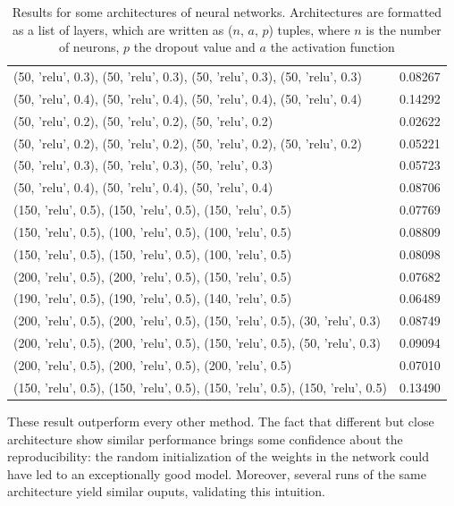 \begin{table}[h!]
\begin{tabular}{|p{}|p{}|}
        (50, 'relu', 0.3), (50, 'relu', 0.3), (50, 'relu', 0.3), (50, 'relu', 0.3) & 0.08267 \\
        (50, 'relu', 0.4), (50, 'relu', 0.4), (50, 'relu', 0.4), (50, 'relu', 0.4) & 0.14292 \\
        (50, 'relu', 0.2), (50, 'relu', 0.2), (50, 'relu', 0.2) & 0.02622 \\
        (50, 'relu', 0.2), (50, 'relu', 0.2), (50, 'relu', 0.2), (50, 'relu', 0.2) & 0.05221 \\
        (50, 'relu', 0.3), (50, 'relu', 0.3), (50, 'relu', 0.3) & 0.05723 \\
        (50, 'relu', 0.4), (50, 'relu', 0.4), (50, 'relu', 0.4) & 0.08706 \\
        (150, 'relu', 0.5), (150, 'relu', 0.5), (150, 'relu', 0.5) & 0.07769 \\
        (150, 'relu', 0.5), (100, 'relu', 0.5), (100, 'relu', 0.5) & 0.08809 \\
        (150, 'relu', 0.5), (150, 'relu', 0.5), (100, 'relu', 0.5) & 0.08098 \\
        (200, 'relu', 0.5), (200, 'relu', 0.5), (150, 'relu', 0.5) & 0.07682 \\
        (190, 'relu', 0.5), (190, 'relu', 0.5), (140, 'relu', 0.5) & 0.06489 \\
        (200, 'relu', 0.5), (200, 'relu', 0.5), (150, 'relu', 0.5), (30, 'relu', 0.3) & 0.08749 \\
        (200, 'relu', 0.5), (200, 'relu', 0.5), (150, 'relu', 0.5), (50, 'relu', 0.3) & 0.09094 \\
        (200, 'relu', 0.5), (200, 'relu', 0.5), (200, 'relu', 0.5) & 0.07010 \\
        (150, 'relu', 0.5), (150, 'relu', 0.5), (150, 'relu', 0.5), (150, 'relu', 0.5) & 0.13490 \\ \hline
    \end{tabular}
    \caption{Results for some architectures of neural networks. Architectures are formatted as a list of layers, which are written as ($n$, $a$, $p$) tuples, where $n$ is the number of neurons, $p$ the dropout value and $a$ the activation function}
    \label{tab:nn-results}
\end{table}

These result outperform every other method. The fact that different but close architecture show similar performance brings some confidence about the reproducibility: the random initialization of the weights in the network could have led to an exceptionally good model. Moreover, several runs of the same architecture yield similar ouputs, validating this intuition.

